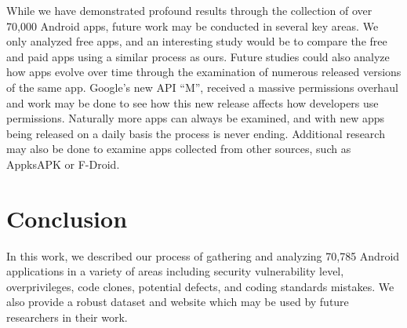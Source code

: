 \documentclass{sig-alternate}
\begin{document}
While we have demonstrated profound results through the collection of over 70,000 Android apps, future work may be conducted in several key areas. We only analyzed free apps, and an interesting study would be to compare the free and paid apps using a similar process as ours. Future studies could also analyze how apps evolve over time through the examination of numerous released versions of the same app. Google's new API ``M'', received a massive permissions overhaul and work may be done to see how this new release affects how developers use permissions. Naturally more apps can always be examined, and with new apps being released on a daily basis the process is never ending. Additional research may also be done to examine apps collected from other sources, such as AppksAPK or F-Droid.








\section{Conclusion}
\label{sec: conclusion}

In this work, we described our process of gathering and analyzing 70,785 Android applications in a variety of areas including security vulnerability level, overprivileges, code clones, potential defects, and coding standards mistakes.
 We also provide a robust dataset and website which may be used by future researchers in their work.



\end{document}
